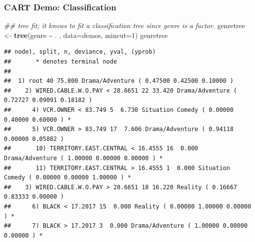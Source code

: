 \documentclass[
  shownotes,
  xcolor={svgnames},
  hyperref={colorlinks,citecolor=DarkBlue,linkcolor=DarkRed,urlcolor=DarkBlue}
  , aspectratio=169]{beamer}
\newenvironment{Shaded}{\begin{snugshade}}{\end{snugshade}}
\newcommand{\CommentTok}[1]{\textcolor[rgb]{0.56,0.35,0.01}{\textit{#1}}}
\newcommand{\DataTypeTok}[1]{\textcolor[rgb]{0.13,0.29,0.53}{#1}}
\newcommand{\DecValTok}[1]{\textcolor[rgb]{0.00,0.00,0.81}{#1}}
\newcommand{\KeywordTok}[1]{\textcolor[rgb]{0.13,0.29,0.53}{\textbf{#1}}}
\newcommand{\NormalTok}[1]{#1}
\newcommand{\OperatorTok}[1]{\textcolor[rgb]{0.81,0.36,0.00}{\textbf{#1}}}
\newcommand{\StringTok}[1]{\textcolor[rgb]{0.31,0.60,0.02}{#1}}
\begin{document}
\begin{frame}[fragile]
\frametitle{CART Demo: Classification}

\begin{scriptsize}
\begin{Shaded}
\begin{Highlighting}[]
\CommentTok{\#\# tree fit; it knows to fit a classification tree since genre is a factor.}
\NormalTok{genretree \textless{}{-}}\StringTok{ }\KeywordTok{tree}\NormalTok{(genre }\OperatorTok{\textasciitilde{}}\StringTok{ }\NormalTok{. , }\DataTypeTok{data=}\NormalTok{demos, }\DataTypeTok{mincut=}\DecValTok{1}\NormalTok{)}
\NormalTok{genretree}
\end{Highlighting}
\end{Shaded}
\end{scriptsize}

\begin{tiny}
\begin{verbatim}
## node), split, n, deviance, yval, (yprob)
##       * denotes terminal node
## 
##  1) root 40 75.800 Drama/Adventure ( 0.47500 0.42500 0.10000 )  
##    2) WIRED.CABLE.W.O.PAY < 28.6651 22 33.420 Drama/Adventure ( 0.72727 0.09091 0.18182 )  
##      4) VCR.OWNER < 83.749 5  6.730 Situation Comedy ( 0.00000 0.40000 0.60000 ) *
##      5) VCR.OWNER > 83.749 17  7.606 Drama/Adventure ( 0.94118 0.00000 0.05882 )  
##       10) TERRITORY.EAST.CENTRAL < 16.4555 16  0.000 Drama/Adventure ( 1.00000 0.00000 0.00000 ) *
##       11) TERRITORY.EAST.CENTRAL > 16.4555 1  0.000 Situation Comedy ( 0.00000 0.00000 1.00000 ) *
##    3) WIRED.CABLE.W.O.PAY > 28.6651 18 16.220 Reality ( 0.16667 0.83333 0.00000 )  
##      6) BLACK < 17.2017 15  0.000 Reality ( 0.00000 1.00000 0.00000 ) *
##      7) BLACK > 17.2017 3  0.000 Drama/Adventure ( 1.00000 0.00000 0.00000 ) *
\end{verbatim}
\end{tiny}
\end{frame}
\end{document}
